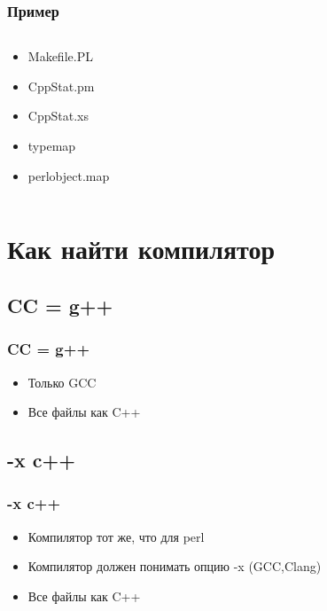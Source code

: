 \documentclass[utf8x]{beamer}
\begin{document}
\begin{frame}[t,fragile]
    \frametitle{Пример}
    \begin{columns}[t]
        \begin{column}{.3\textwidth}
            \begin{itemize}
                \item<alert@1> Makefile.PL
                \item<alert@2> CppStat.pm
                \item<alert@3-5> CppStat.xs
                \item typemap
                \item perlobject.map
            \end{itemize}
        \end{column}
        \begin{column}{.8\textwidth}
            \only<1>{  }
            \only<2>{  }
        \end{column}
    \end{columns}
\end{frame}


\section{Как найти компилятор}

\subsection{CC = g++}
\begin{frame}[fragile]
    \frametitle{CC = g++}
    
    \begin{itemize}
        \item Только GCC
        \item Все файлы как C++
    \end{itemize}
\end{frame}

\subsection{-x c++}
\begin{frame}[fragile]
    \frametitle{-x c++}
    
    \begin{itemize}
        \item Компилятор тот же, что для perl
        \item Компилятор должен понимать опцию -x (GCC,Clang)
        \item Все файлы как C++
    \end{itemize}
\end{frame}
\end{document}
